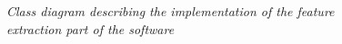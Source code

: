 		\begin{figure}[h]
		  \begin{center} 
		  \end{center} 
		  \caption{\textit{Class diagram describing the implementation of the feature extraction part of the software}}  
		  \label{fig:impl_feat_extraction}
	 	\end{figure}	


